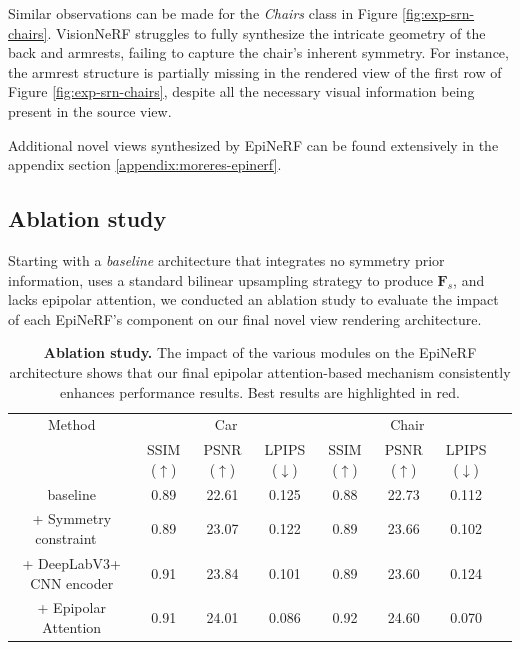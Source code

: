 Similar observations can be made for the \textit{Chairs} class in Figure \ref{fig:exp-srn-chairs}. VisionNeRF struggles to fully synthesize the intricate geometry of the back and armrests, failing to capture the chair's inherent symmetry. For instance, the armrest structure is partially missing in the rendered view of the first row of Figure \ref{fig:exp-srn-chairs}, despite all the necessary visual information being present in the source view. \newline

Additional novel views synthesized by EpiNeRF can be found extensively in the appendix section \ref{appendix:moreres-epinerf}.

\subsection{Ablation study}
Starting with a \textit{baseline} architecture that integrates no symmetry prior information, uses a standard bilinear upsampling strategy to produce $\mathbf{F}_{s}$, and lacks epipolar attention, we conducted an ablation study to evaluate the impact of each EpiNeRF's component on our final novel view rendering architecture.

\begin{table}[htp!]
\caption{\textbf{Ablation study.} The impact of the various modules on the EpiNeRF architecture shows that our final epipolar attention-based mechanism consistently enhances performance results. Best results are highlighted in \colorbox{red!25}{red}.}
\label{tab:ablation}
\begin{center}
\centering
\begin{adjustbox}{width=\textwidth}
\begin{tabular}[h]{c||ccccccc}
\hline
Method & \multicolumn{3}{c}{Car} & \multicolumn{3}{c}{Chair} \\
 &  SSIM ($\uparrow$) & PSNR ($\uparrow$) & LPIPS ($\downarrow$) & SSIM ($\uparrow$) & PSNR ($\uparrow$) & LPIPS ($\downarrow$)\\[.5pt]
\hline
baseline & 0.89 & 22.61 & 0.125 & 0.88 & 22.73 & 0.112  \\[1.5pt]
\hline 
+ Symmetry constraint ~\citep{li2022symmnerf}  & 0.89 & 23.07  & 0.122 & 0.89 & 23.66 & 0.102 \\
+ DeepLabV3+ CNN encoder  & 0.91 & 23.84 & 0.101 & 0.89 & 23.60  & 0.124  \\
+ Epipolar Attention  & \cellcolor{red!25}0.91 & \cellcolor{red!25}24.01 &\cellcolor{red!25}0.086 & \cellcolor{red!25}0.92 &  \cellcolor{red!25}24.60 &\cellcolor{red!25}0.070 \\
\hline 
\end{tabular}
\end{adjustbox}
\end{center}

\end{table}

